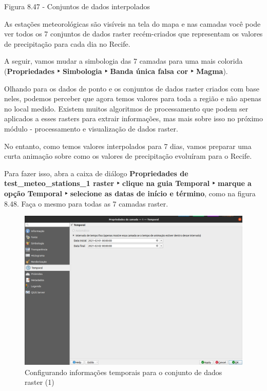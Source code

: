 \documentclass[
]{book}
\begin{document}
Figura 8.47 - Conjuntos de dados interpolados

As estações meteorológicas são visíveis na tela do mapa e nas camadas você pode ver todos os 7 conjuntos de dados raster recém-criados que representam os valores de precipitação para cada dia no Recife.

A seguir, vamos mudar a simbologia das 7 camadas para uma mais colorida (\textbf{Propriedades ‣ Simbologia ‣ Banda única falsa cor ‣ Magma}).

Olhando para os dados de ponto e os conjuntos de dados raster criados com base neles, podemos perceber que agora temos valores para toda a região e não apenas no local medido. Existem muitos algoritmos de processamento que podem ser aplicados a esses rasters para extrair informações, mas mais sobre isso no próximo módulo - processamento e visualização de dados raster.

No entanto, como temos valores interpolados para 7 dias, vamos preparar uma curta animação sobre como os valores de precipitação evoluíram para o Recife.

Para fazer isso, abra a caixa de diálogo \textbf{Propriedades de test\_meteo\_stations\_1 raster ‣ clique na guia Temporal ‣ marque a opção Temporal ‣ selecione as datas de início e término}, como na figura 8.48. Faça o mesmo para todas as 7 camadas raster.

\begin{figure}
\centering
\includegraphics{media/modulo8/fig848_a.png}
\caption{Configurando informações temporais para o conjunto de dados raster (1)}
\end{figure}
\end{document}
